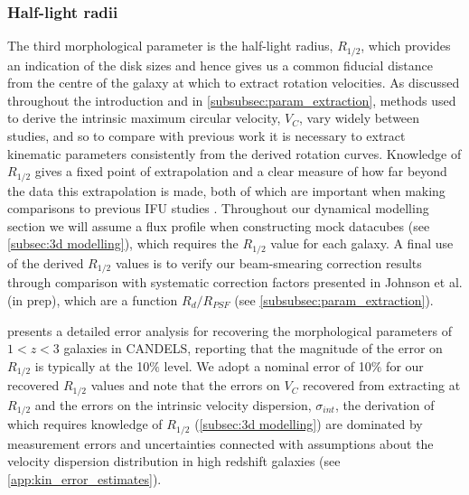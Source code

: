 \documentclass[fleqn,usenatbib]{mn2e}
\begin{document}
\subsubsection{Half-light radii}\label{subsubsection:half-light_radii}
The third morphological parameter is the half-light radius, $R_{1/2}$, which provides an indication of the disk sizes and hence gives us a common fiducial distance from the centre of the galaxy at which to extract rotation velocities.
As discussed throughout the introduction and in \cref{subsubsec:param_extraction}, methods used to derive the intrinsic maximum circular velocity, $V_{C}$, vary widely between studies, and so to compare with previous work it is necessary to extract kinematic parameters consistently from the derived rotation curves.
Knowledge of $R_{1/2}$ gives a fixed point of extrapolation and a clear measure of how far beyond the data this extrapolation is made, both of which are important when making comparisons to previous IFU studies \citep[e.g.][]{ForsterSchreiber2009,Epinat2012,Wisnioski2015,Stott2016,Harrison2017,Swinbank2017}.
Throughout our dynamical modelling section we will assume a flux profile when constructing mock datacubes (see \cref{subsec:3d modelling}), which requires the $R_{1/2}$ value for each galaxy.
A final use of the derived $R_{1/2}$ values is to verify our beam-smearing correction results through comparison with systematic correction factors presented in Johnson et al. (in prep), which are a function $R_{d} / R_{PSF}$ (see \cref{subsubsec:param_extraction}).

\cite{Bruce2012} presents a detailed error analysis for recovering the morphological parameters of $1 < z < 3$ galaxies in CANDELS, reporting that the magnitude of the error on $R_{1/2}$ is typically at the 10$\%$ level.
We adopt a nominal error of 10$\%$ for our recovered $R_{1/2}$ values and note that the errors on $V_{C}$ recovered from extracting at $R_{1/2}$ and the errors on the intrinsic velocity dispersion, $\sigma_{int}$, the derivation of which requires knowledge of $R_{1/2}$ (\cref{subsec:3d modelling}) are dominated by measurement errors and uncertainties connected with assumptions about the velocity dispersion distribution in high redshift galaxies (see \cref{app:kin_error_estimates}).
\end{document}
